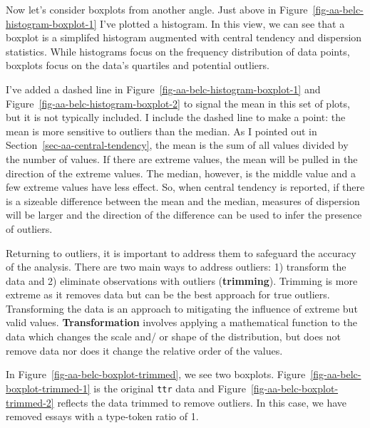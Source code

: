 \documentclass[
  letterpaper,
]{latex/krantz}
\theoremstyle{definition}
\theoremstyle{remark}
\begin{document}
Now let's consider boxplots from another angle. Just above in
Figure~\ref{fig-aa-belc-histogram-boxplot-1} I've plotted a histogram.
In this view, we can see that a boxplot is a simplifed histogram
augmented with central tendency and dispersion statistics. While
histograms focus on the frequency distribution of data points, boxplots
focus on the data's quartiles and potential outliers.

I've added a dashed line in Figure~\ref{fig-aa-belc-histogram-boxplot-1}
and Figure~\ref{fig-aa-belc-histogram-boxplot-2} to signal the mean in
this set of plots, but it is not typically included. I include the
dashed line to make a point: the mean is more sensitive to outliers than
the median. As I pointed out in Section~\ref{sec-aa-central-tendency},
the mean is the sum of all values divided by the number of values. If
there are extreme values, the mean will be pulled in the direction of
the extreme values. The median, however, is the middle value and a few
extreme values have less effect. So, when central tendency is reported,
if there is a sizeable difference between the mean and the median,
measures of dispersion will be larger and the direction of the
difference can be used to infer the presence of outliers.

Returning to outliers, it is important to address them to safeguard the
accuracy of the analysis. There are two main ways to address outliers:
1) transform the data and 2) eliminate observations with outliers
(\textbf{trimming}). Trimming is more extreme as it removes data but can
be the best approach for true outliers. Transforming the data is an
approach to mitigating the influence of extreme but valid values.
\textbf{Transformation} involves applying a mathematical function to the
data which changes the scale and/ or shape of the distribution, but does
not remove data nor does it change the relative order of the values.

In Figure~\ref{fig-aa-belc-boxplot-trimmed}, we see two boxplots.
Figure~\ref{fig-aa-belc-boxplot-trimmed-1} is the original \texttt{ttr}
data and Figure~\ref{fig-aa-belc-boxplot-trimmed-2} reflects the data
trimmed to remove outliers. In this case, we have removed essays with a
type-token ratio of 1.
\end{document}
